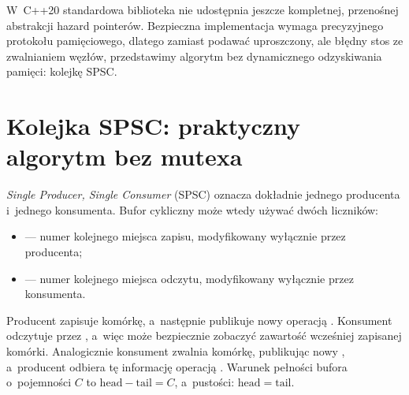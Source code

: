 W~C++20 standardowa biblioteka nie udostępnia jeszcze kompletnej,
przenośnej abstrakcji hazard pointerów. Bezpieczna implementacja
wymaga precyzyjnego protokołu pamięciowego, dlatego zamiast podawać
uproszczony, ale błędny stos ze zwalnianiem węzłów, przedstawimy
algorytm bez dynamicznego odzyskiwania pamięci: kolejkę SPSC.

\section{Kolejka SPSC: praktyczny algorytm bez mutexa}
\label{sec:cpp16-spsc}

\emph{Single Producer, Single Consumer} (SPSC) oznacza dokładnie
jednego producenta i~jednego konsumenta. Bufor cykliczny może wtedy
używać dwóch liczników:
\begin{itemize}
\item {} --- numer kolejnego miejsca zapisu, modyfikowany
      wyłącznie przez producenta;
\item {} --- numer kolejnego miejsca odczytu, modyfikowany
      wyłącznie przez konsumenta.
\end{itemize}

Producent zapisuje komórkę, a~następnie publikuje nowy 
operacją . Konsument odczytuje  przez
, a~więc może bezpiecznie zobaczyć zawartość wcześniej
zapisanej komórki. Analogicznie konsument zwalnia komórkę, publikując
nowy , a~producent odbiera tę informację operacją
. Warunek pełności bufora o~pojemności \(C\) to
\(\mathrm{head}-\mathrm{tail}=C\), a~pustości:
\(\mathrm{head}=\mathrm{tail}\).

